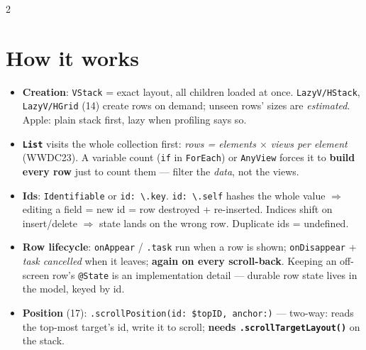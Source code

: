 \documentclass[8pt]{extarticle}
\begin{document}



\begin{multicols}{2}
\raggedright

\section{How it works}
\begin{itemize}
  \item \textbf{Creation}: \texttt{VStack} = exact layout, all children loaded at once. \texttt{LazyV/HStack},
        \texttt{LazyV/HGrid} (14) create rows on demand; unseen rows' sizes are \emph{estimated}. Apple:
        plain stack first, lazy when profiling says so.
  \item \textbf{\texttt{List}} visits the whole collection first: \emph{rows = elements $\times$ views per
        element} (WWDC23). A variable count (\texttt{if} in \texttt{ForEach}) or \texttt{AnyView} forces it to
        \textbf{build every row} just to count them — filter the \emph{data}, not the views.
  \item \textbf{Ids}: \texttt{Identifiable} or \texttt{id: \textbackslash.key}. \texttt{id: \textbackslash.self}
        hashes the whole value $\Rightarrow$ editing a field = new id = row destroyed + re-inserted.
        Indices shift on insert/delete $\Rightarrow$ state lands on the wrong row. Duplicate ids = undefined.
  \item \textbf{Row lifecycle}: \texttt{onAppear} / \texttt{.task} run when a row is shown;
        \texttt{onDisappear} + \emph{task cancelled} when it leaves; \textbf{again on every scroll-back}.
        Keeping an off-screen row's \texttt{@State} is an implementation detail — durable row state
        lives in the model, keyed by id.
  \item \textbf{Position} (17): \texttt{.scrollPosition(id: \$topID, anchor:)} — two-way: reads the
        top-most target's id, write it to scroll; \textbf{needs \texttt{.scrollTargetLayout()}} on the stack.

\end{itemize}
\end{multicols}
\end{document}
